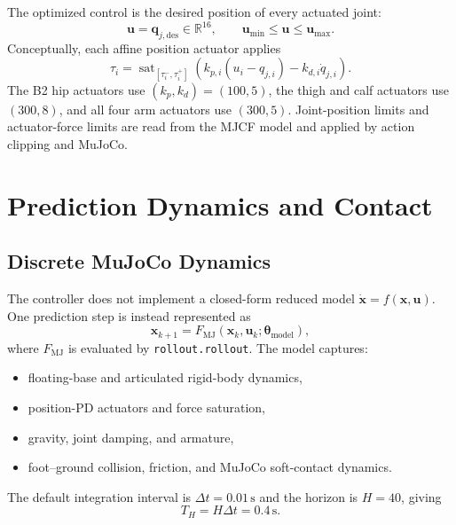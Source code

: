 \documentclass[11pt,a4paper]{article}
\newcommand{\R}{\mathbb{R}}
\newcommand{\code}[1]{\texttt{#1}}
\begin{document}
The optimized control is the desired position of every actuated joint:
\begin{equation}
  \boxed{\bm{u}=\bm{q}_{j,\mathrm{des}}\in\R^{16}},
  \qquad
  \bm{u}_{\min}\leq\bm{u}\leq\bm{u}_{\max}.
\end{equation}
Conceptually, each affine position actuator applies
\begin{equation}
  \tau_i =
  \operatorname{sat}_{[\tau_i^-,\tau_i^+]}
  \left(k_{p,i}(u_i-q_{j,i})-k_{d,i}\dot q_{j,i}\right).
\end{equation}
The B2 hip actuators use $(k_p,k_d)=(100,5)$, the thigh and calf actuators
use $(300,8)$, and all four arm actuators use $(300,5)$. Joint-position
limits and actuator-force limits are read from the MJCF model and applied by
action clipping and MuJoCo.

\section{Prediction Dynamics and Contact}

\subsection{Discrete MuJoCo Dynamics}

The controller does not implement a closed-form reduced model
$\dot{\bm{x}}=f(\bm{x},\bm{u})$. One prediction step is instead represented as
\begin{equation}
  \boxed{
  \bm{x}_{k+1}=F_{\mathrm{MJ}}
  (\bm{x}_k,\bm{u}_k;\bm{\theta}_{\mathrm{model}}),
  }
\end{equation}
where $F_{\mathrm{MJ}}$ is evaluated by \code{rollout.rollout}. The model
captures:
\begin{itemize}
  \item floating-base and articulated rigid-body dynamics,
  \item position-PD actuators and force saturation,
  \item gravity, joint damping, and armature,
  \item foot--ground collision, friction, and MuJoCo soft-contact dynamics.
\end{itemize}

The default integration interval is $\Delta t=0.01\,\mathrm{s}$ and the
horizon is $H=40$, giving
\begin{equation}
  T_H=H\Delta t=0.4\,\mathrm{s}.
\end{equation}
\end{document}
